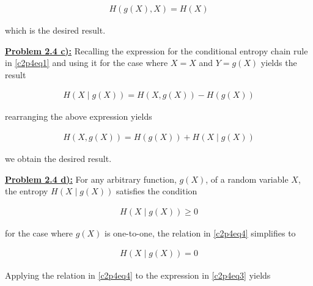 \documentclass{article}[12pt]
\numberwithin{equation}{subsection}
\newcommand{\prob}[1]{\textbf{\underline{Problem #1):}}}
\begin{document}
\begin{flushleft}
\begin{align*} 
H \left( g \left( X \right), X \right) = H \left( X \right)  
\end{align*}

which is the desired result.



\vspace{0.5in}

\prob{2.4 c}  Recalling the expression for the conditional entropy chain rule in \ref{c2p4eq1} and using it for the case where $X = X$ and $Y = g \left( X \right)$ yields the result

\begin{align*} 
H \left( X \mid g \left( X \right) \right) = H \left( X, g \left( X \right) \right) - H \left( g \left( X \right) \right)  
\end{align*}

rearranging the above expression yields 

\begin{align} \label{c2p4eq3}
H \left( X, g \left( X \right) \right) = H \left( g \left( X \right) \right) + H \left( X \mid g \left( X \right) \right)  \tag{2.4-3}
\end{align}

we obtain the desired result.



\vspace{0.5in}

\prob{2.4 d}  For any arbitrary function, $g \left( X \right)$, of a random variable $X$, the entropy $H \left( X \mid g \left( X \right)\right)$ satisfies the condition

\begin{align} \label{c2p4eq4}
H \left( X \mid g \left( X \right)\right) \geq 0  \tag{2.4-4}
\end{align}

for the case where $g \left( X \right)$ is one-to-one, the relation in \ref{c2p4eq4} simplifies to

\begin{align*}
H \left( X \mid g \left( X \right)\right) = 0
\end{align*}

Applying the relation in \ref{c2p4eq4} to the expression in \ref{c2p4eq3} yields


\end{flushleft}
\end{document}

